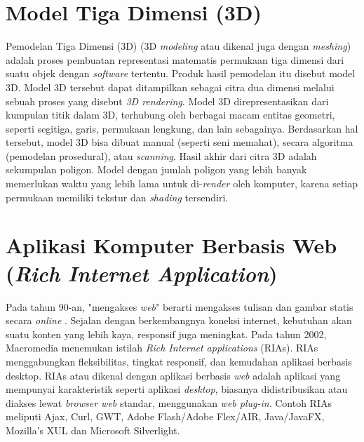 \section{Model Tiga Dimensi (3D)}
\label{sec:model_3d}
Pemodelan Tiga Dimensi (3D) (3D \textit{modeling} atau dikenal juga dengan \textit{meshing}) adalah proses pembuatan representasi matematis permukaan tiga dimensi dari suatu objek dengan \textit{software} tertentu. Produk hasil pemodelan itu disebut model 3D. Model 3D tersebut dapat ditampilkan sebagai citra dua dimensi melalui sebuah proses yang disebut \textit{3D rendering}.
%
%
Model 3D direpresentasikan dari kumpulan titik dalam 3D, terhubung oleh berbagai macam entitas geometri, seperti segitiga, garis, permukaan lengkung, dan lain sebagainya. Berdasarkan hal tersebut, model 3D bisa dibuat manual (seperti seni memahat), secara algoritma (pemodelan prosedural), atau \textit{scanning}. Hasil akhir dari citra 3D adalah sekumpulan poligon. Model dengan jumlah poligon yang lebih banyak memerlukan waktu yang lebih lama untuk di-\textit{render} oleh komputer, karena setiap permukaan memiliki tekstur dan \textit{shading} tersendiri. 

\section{Aplikasi Komputer Berbasis Web (\textit{Rich Internet Application})}
\label{sec:aplikasi_web}

Pada tahun 90-an, "mengakses \textit{web}" berarti mengakses tulisan dan gambar statis secara \textit{online} . Sejalan dengan berkembangnya koneksi internet, kebutuhan akan suatu konten yang lebih kaya, responsif juga meningkat. Pada tahun 2002, Macromedia menemukan istilah \textit{Rich Internet applications} (RIAs). RIAs menggabungkan fleksibilitas, tingkat responsif, dan kemudahan aplikasi berbasis desktop. RIAs atau dikenal dengan aplikasi berbasis \textit{web} adalah aplikasi yang mempunyai karakteristik seperti aplikasi \textit{desktop}, biasanya didistribusikan atau diakses lewat \textit{browser web} standar, menggunakan \textit{web plug-in}. Contoh RIAs meliputi Ajax, Curl, GWT, Adobe Flash/Adobe Flex/AIR, Java/JavaFX, Mozilla's XUL dan Microsoft Silverlight. 

